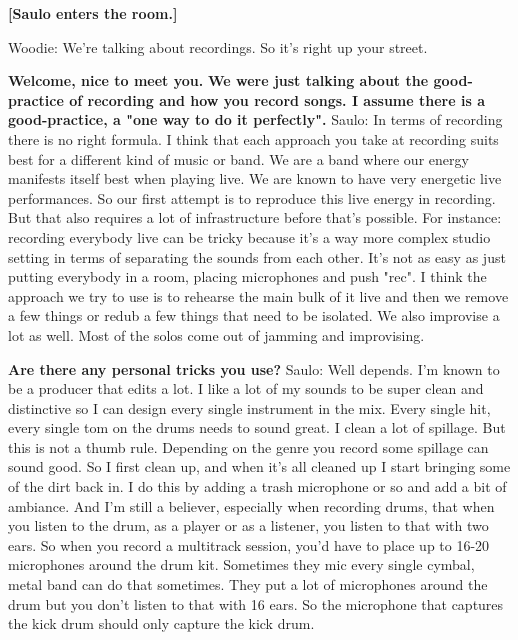 \textbf{[Saulo enters the room.]}

Woodie: We're talking about recordings. So it's right up your street.

\textbf{Welcome, nice to meet you.}\newline
\textbf{We were just talking about the good-practice of recording and how you record songs. I assume there is a good-practice, a "one way to do it perfectly".}
\newline Saulo: In terms of recording there is no right formula. I think that each approach you take at recording suits best for a different kind of music or band.
We are a band where our energy manifests itself best when playing live. We are known to have very energetic live performances.
So our first attempt is to reproduce this live energy in recording. But that also requires a lot of infrastructure before that's possible.
\newline For instance: recording everybody live can be tricky because it's a way more complex studio setting in terms of separating the sounds from each other.
It's not as easy as just putting everybody in a room, placing microphones and push "rec".
I think the approach we try to use is to rehearse the main bulk of it live and then we remove a few things or redub a few things that need to be isolated.
We also improvise a lot as well. Most of the solos come out of jamming and improvising.

\textbf{Are there any personal tricks you use?}
\newline Saulo: Well depends. I'm known to be a producer that edits a lot. I like a lot of my sounds to be super clean and distinctive so I can design every single instrument in the mix.
Every single hit, every single tom on the drums needs to sound great. I clean a lot of spillage. But this is not a thumb rule. Depending on the genre you record some spillage can sound good.
So I first clean up, and when it's all cleaned up I start bringing some of the dirt back in. I do this by adding a trash microphone or so and add a bit of ambiance.
And I'm still a believer, especially when recording drums, that when you listen to the drum, as a player or as a listener, you listen to that with two ears.
So when you record a multitrack session, you'd have to place up to 16-20 microphones around the drum kit. Sometimes they mic every single cymbal, metal band can do that sometimes.
They put a lot of microphones around the drum but you don't listen to that with 16 ears. So the microphone that captures the kick drum should only capture the kick drum.

